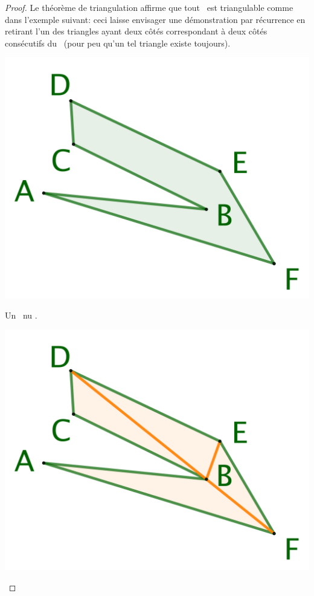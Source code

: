 \begin{proof}
	Le théorème de triangulation affirme que tout \ngone\ est triangulable comme dans l'exemple suivant: ceci laisse envisager une démonstration par récurrence en retirant l'un des triangles ayant deux côtés correspondant à deux côtés consécutifs du \ngone\ (pour peu qu'un tel triangle existe toujours).


    \begin{multicols}{3}
        \small\itshape
        \begin{center}
            \includegraphics[scale=.4]{content/polygon/alg-area/triangulation-1.png}

            \smallskip
            Un \ngone\ \og nu \fg.
        \end{center}


        \begin{center}
            \includegraphics[scale=.4]{content/polygon/alg-area/triangulation-2.png}


\end{center}
\end{multicols}
\end{proof}
